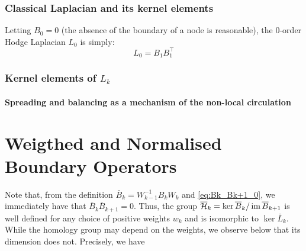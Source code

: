 
\subsubsection{ Classical Laplacian and its kernel elements }

Letting \( B_0 = 0 \) (the absence of the boundary of a node is reasonable), the \(0\)-order Hodge Laplacian \( L_0 \) is simply:
\begin{equation}
      L_0 = B_1 B_1^\top
\end{equation}


\subsubsection{ Kernel elements of \( L_k \) }


\paragraph{ Spreading and balancing as a mechanism of the non-local circulation}
















\section{ Weigthed and Normalised Boundary Operators}







Note that, from the definition \( \bar B_k= W_{k-1}^{-1} B_k W_k \) and \eqref{eq:Bk_Bk+1_0}, we immediately have that  \( \bar B_k\bar B_{k+1}=0 \). Thus, the group \( \overline{\mathcal{H}}_k = \ker \overline{B}_k / \operatorname{im} \overline{B}_{k+1} \) is well defined for any choice of positive weights  \( w_k \) and is isomorphic to \( \ker \bar L_k \). While the homology group may depend on the weights,  we observe below that its dimension does not. Precisely, we have 

